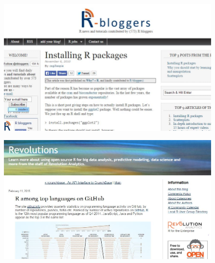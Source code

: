 \documentclass{beamer}
\begin{document}
\begin{frame}
	\begin{figure}
		\centering
		\includegraphics[width=1.05\linewidth]{rbloggers}
		
	\end{figure}
	
\end{frame}
\begin{frame}
	\begin{figure}
		\centering
		\includegraphics[width=1.05\linewidth]{revoblog}
		
	\end{figure}
	
\end{frame}
\end{document}
